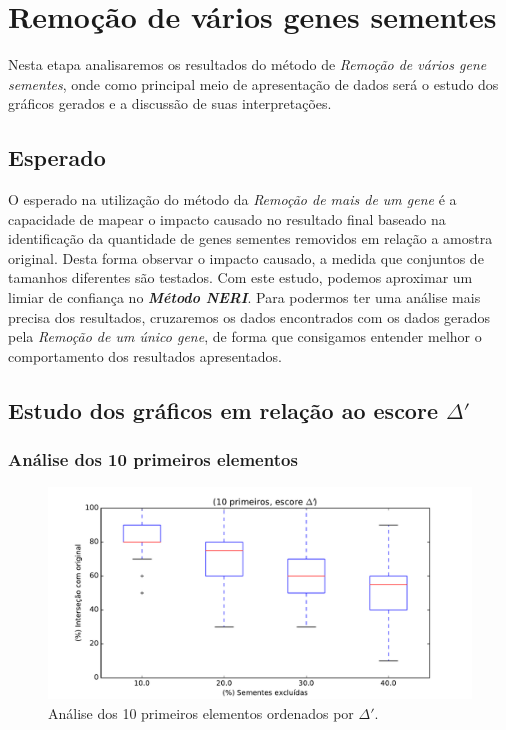 \section{Remoção de vários genes sementes}
%
Nesta etapa analisaremos os resultados do método de \textit{Remoção de vários gene sementes}, onde como principal meio de apresentação de dados será o estudo dos gráficos gerados e a discussão de suas interpretações.

\subsection{Esperado}
%
O esperado na utilização do método da \textit{Remoção de mais de um gene} é a capacidade de mapear o impacto causado no resultado final baseado na identificação da quantidade de genes sementes removidos em relação a amostra original. Desta forma observar o impacto causado, a medida que conjuntos de tamanhos diferentes são testados. Com este estudo, podemos aproximar um limiar de confiança no \textsl{\textbf{Método NERI}}. Para podermos ter uma análise mais precisa dos resultados, cruzaremos os dados encontrados com os dados gerados pela \textit{Remoção de um único gene}, de forma que consigamos entender melhor o comportamento dos resultados apresentados.
%
%
%
%
\subsection{Estudo dos gráficos em relação ao escore $\Delta'$}
%
\subsubsection{Análise dos 10 primeiros elementos}
%
\begin{figure}[ht!]
\centering
\includegraphics[width=\textwidth]{Images/analyses/fig_S_10_40.pdf}
\caption {Análise dos 10 primeiros elementos ordenados por $\Delta'$.
\label{fig_S_10_40}}
\end{figure}
%

